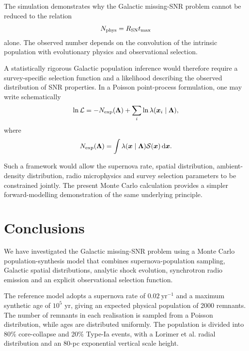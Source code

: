 \documentclass[
aps,
prd,
reprint,
superscriptaddress,
nofootinbib
]{revtex4-2}
\newcommand{\dd}{\mathrm{d}}
\begin{document}
	The simulation demonstrates why the Galactic missing-SNR problem cannot be
	reduced to the relation
	\begin{equation}
		N_{\rm phys}=R_{\rm SN}t_{\rm max}
	\end{equation}
	alone.  The observed number depends on the convolution of the intrinsic
	population with evolutionary physics and observational selection.
	
	A statistically rigorous Galactic population inference would therefore
	require a survey-specific selection function and a likelihood describing the
	observed distribution of SNR properties.  In a Poisson point-process
	formulation, one may write schematically
	\begin{equation}
		\ln{\cal L}
		=
		-N_{\rm exp}(\bm{\Lambda})
		+
		\sum_i
		\ln\lambda(\bm{x}_i\mid\bm{\Lambda}),
		\label{eq:ppp}
	\end{equation}
	where
	\begin{equation}
		N_{\rm exp}(\bm{\Lambda})
		=
		\int
		\lambda(\bm{x}\mid\bm{\Lambda})
		{\cal S}(\bm{x})
		\,\dd\bm{x}.
		\label{eq:nexp}
	\end{equation}
	
	Such a framework would allow the supernova rate, spatial distribution,
	ambient-density distribution, radio microphysics and survey selection
	parameters to be constrained jointly.  The present Monte Carlo calculation
	provides a simpler forward-modelling demonstration of the same underlying
	principle.
	
	\section{Conclusions}
	\label{sec:conclusions}
	
	We have investigated the Galactic missing-SNR problem using a Monte Carlo
	population-synthesis model that combines supernova-population sampling,
	Galactic spatial distributions, analytic shock evolution, synchrotron
	radio emission and an explicit observational selection function.
	
	The reference model adopts a supernova rate of
	$0.02~\mathrm{yr^{-1}}$ and a maximum synthetic age of $10^5$ yr, giving an
	expected physical population of 2000 remnants.  The number of remnants in
	each realisation is sampled from a Poisson distribution, while ages are
	distributed uniformly.  The population is divided into 80\% core-collapse and
	20\% Type-Ia events, with a Lorimer et al. radial distribution and an
	80-pc exponential vertical scale height.
	
\end{document}
